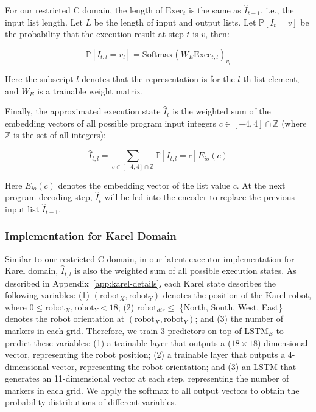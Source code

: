 For our restricted C domain, the length of $\mathrm{Exec}_t$ is the same as $\hat I_{t-1}$, i.e., the input list length. Let $L$ be the length of input and output lists. Let $\mathbb{P}[I_t=v]$ be the probability that the execution result at step $t$ is $v$, then:   

\[\mathbb{P}[I_{t,l}=v_l]=\mathrm{Softmax}(W_E\mathrm{Exec}_{t,l})_{v_l}\]

Here the subscript $l$ denotes that the representation is for the $l$-th list element, and $W_E$ is a trainable weight matrix.

\def\zz{\mathbb{Z}}

Finally, the approximated execution state $\hat{I}_t$ is the weighted sum of the embedding vectors of all possible program input integers $c \in [-4, 4] \cap \zz$ (where $\zz$ is the set of all integers): 

\[\hat I_{t,l}=\sum_{c \in [-4, 4]\cap \zz}\mathbb{P}[I_{t,l}=c]E_{io}(c)\]

Here $E_{io}(c)$ denotes the embedding vector of the list value $c$. At the next program decoding step, $\hat{I}_t$ will be fed into the encoder to replace the previous input list $\hat{I}_{t-1}$. 

\subsubsection{Implementation for Karel Domain}
\label{app:latent-executor-karel}

Similar to our restricted C domain, in our latent executor implementation for Karel domain, $\hat I_{t,l}$ is also the weighted sum of all possible execution states. As described in Appendix~\ref{app:karel-details}, each Karel state describes the following variables: (1) $(\text{robot}_X, \text{robot}_Y)$ denotes the position of the Karel robot, where $0 \leq \text{robot}_X, \text{robot}_Y < 18$; (2) $\text{robot}_{dir} \leq$ \{North, South, West, East\} denotes the robot orientation at $(\text{robot}_X, \text{robot}_Y)$; and (3) the number of markers in each grid. Therefore, we train 3 predictors on top of $\mathrm{LSTM}_E$ to predict these variables: (1) a trainable layer that outputs a ($18 \times 18$)-dimensional vector, representing the robot position; (2) a trainable layer that outputs a $4$-dimensional vector, representing the robot orientation; and (3) an LSTM that generates an 11-dimensional vector at each step, representing the number of markers in each grid. We apply the softmax to all output vectors to obtain the probability distributions of different variables.

